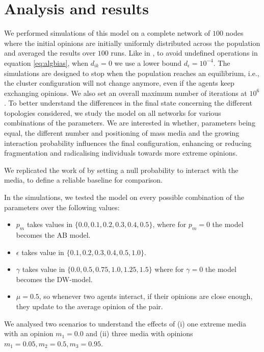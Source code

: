 \documentclass[10pt,letterpaper]{article}
\begin{document}
\section{Analysis and results}
\label{sec:results}
We performed simulations of this model on a complete network of $100$ nodes where the initial opinions are initially uniformly distributed across the population and averaged the results over $100$ runs. Like in \cite{Srbu2019AlgorithmicBA}, to avoid undefined operations in equation \ref{eq:algbias}, when $d_{ik} = 0$ we use a lower bound $d_{\epsilon} = 10^{-4}$. 
The simulations are designed to stop when the population reaches an equilibrium, i.e., the cluster configuration will not change anymore, even if the agents keep exchanging opinions. 
We also set an overall maximum number of iterations at $10^6$. 
To better understand the differences in the final state concerning the different topologies considered, we study the model on all networks for various combinations of the parameters. 
We are interested in whether, parameters being equal, the different number and positioning of mass media and the growing interaction probability influences the final configuration, enhancing or reducing fragmentation and radicalising individuals towards more extreme opinions. 

We replicated the work of \cite{Srbu2019AlgorithmicBA} by setting a null probability to interact with the media, to define a reliable baseline for comparison. 

In the simulations, we tested the model on every possible combination of the parameters over the following values:
\begin{itemize}
    \item $p_{m}$ takes values in $\{0.0, 0.1, 0.2, 0.3, 0.4, 0.5\}$, where for $p_{m}=0$ the model becomes the AB model.
    \item $\epsilon$ takes value in $\{0.1, 0.2, 0.3, 0.4, 0.5, 1.0\}$.
    \item $\gamma$ takes value in $\{0.0, 0.5, 0.75, 1.0, 1.25, 1.5\}$ where for $\gamma = 0$ the model becomes the DW-model.
    \item $\mu = 0.5$, so whenever two agents interact, if their opinions are close enough, they update to the average opinion of the pair.
\end{itemize}

We analysed two scenarios to understand the effects of (i) one extreme media with an opinion $m_{1}=0.0$ and (ii) three media with opinions $m_{1}=0.05, m_{2}=0.5, m_{3}=0.95$. 
\end{document}
